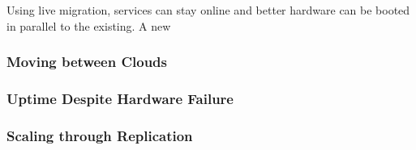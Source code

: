 \documentclass[a4paper]{IEEEtran}
\begin{document}
Using live migration, services can stay online and better hardware can
be booted in parallel to the existing. A new 

\subsubsection{Moving between Clouds}
\label{sec:movclouds}

\blindtext

\subsubsection{Uptime Despite Hardware Failure}
\label{sec:hardfail}

\blindtext

\subsubsection{Scaling through Replication}


\end{document}
